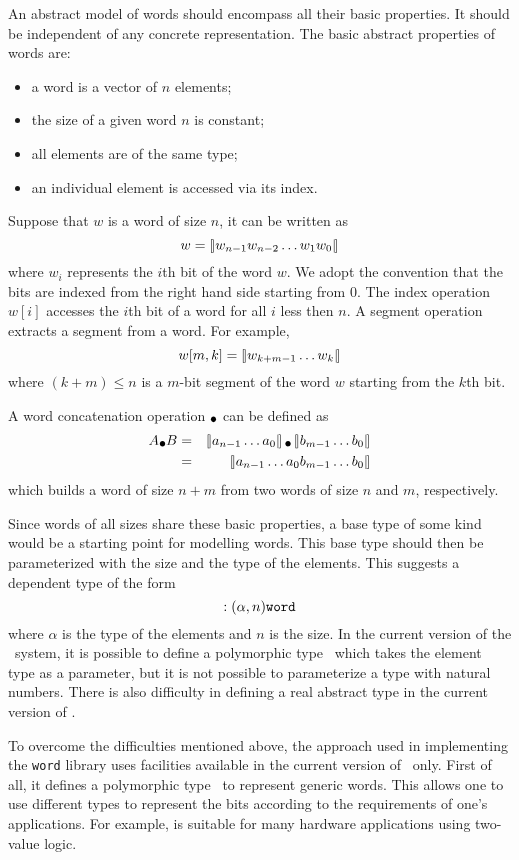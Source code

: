 An abstract model of words should encompass all their basic
properties. It should be independent of any concrete representation.
The basic abstract properties of words are:
\begin{itemize}
\item a word is a vector of $n$ elements;
\item the size of a given word $n$ is constant;
\item all elements are of the same type;
\item an individual element is accessed via its index.
\end{itemize}
Suppose that $w$ is a word of size $n$, it can be written as
\[
w = \left[\mkern-2.5mu\left|w_{n-1} w_{n-2} \ldots w_1 w_0\right|\mkern-2mu\right]
\]
where $w_i$ represents the $i$th bit of the word $w$.
We adopt the convention that the bits are indexed from the right hand
side starting from 0. The index operation $w[i]$ accesses the $i$th
bit of a word for all $i$ less then $n$. A segment operation extracts a
segment from a word. For example, 
\begin{equation}
w[m,k] = \left[\mkern-2.5mu\left|w_{k + m -1} \ldots w_k\right|\mkern-2mu\right]\label{eq-seg}
\end{equation}
where $(k + m) \leq n$ is a $m$-bit segment of the word $w$ starting
from the $k$th bit.

A word concatenation operation $\wcat$ can be defined as
\begin{eqnarray}
A \wcat B & = & \nword{a_{n-1}\ldots a_0} \wcat \nword{b_{m-1}\ldots b_0}\\ \nonumber
          & = & \nword{a_{n-1}\ldots a_0 b_{m-1}\ldots b_0} \label{eq-wordct}
\end{eqnarray}
which builds a word of size $n + m$ from two words of size $n$ and
$m$, respectively.

Since words of all sizes share these basic properties, a base type of
some kind would be a starting point for modelling words. This base
type should then be parameterized with the size and the type of the
elements.  This suggests a dependent type of the form
\[:(\alpha, n)\mbox{\tt word} \]
where $\alpha$ is the type of the elements and $n$ is the size. 
In the current version of the \HOL\ system, it is possible to define a
polymorphic type \word{$\alpha$}\ which takes the element type as a
parameter, but it is not possible to parameterize a type with natural numbers.
There is also difficulty in defining a real abstract type in the current
version of \HOL.

To overcome the difficulties mentioned above, the approach used in
implementing the {\tt word} library  uses  facilities available in the
current version of \HOL\ only. First of all, it defines a polymorphic
type \word{*}\ to represent generic words. This allows one to use
different types to represent the bits according to the requirements of
one's  applications. For example,  is suitable for many hardware
applications using two-value logic. 

